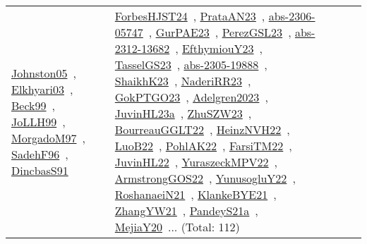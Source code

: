 {\begin{longtable}{lp{3cm}>{\raggedright\arraybackslash}p{6cm}>{\raggedright\arraybackslash}p{6cm}>{\raggedright\arraybackslash}p{8cm}}
\href{../works/Johnston05.pdf}{Johnston05}~\cite{Johnston05}, \href{../works/Elkhyari03.pdf}{Elkhyari03}~\cite{Elkhyari03}, \href{../works/Beck99.pdf}{Beck99}~\cite{Beck99}, \href{../works/JoLLH99.pdf}{JoLLH99}~\cite{JoLLH99}, \href{../works/MorgadoM97.pdf}{MorgadoM97}~\cite{MorgadoM97}, \href{../works/SadehF96.pdf}{SadehF96}~\cite{SadehF96}, \href{../works/DincbasS91.pdf}{DincbasS91}~\cite{DincbasS91} & \href{../works/ForbesHJST24.pdf}{ForbesHJST24}~\cite{ForbesHJST24}, \href{../works/PrataAN23.pdf}{PrataAN23}~\cite{PrataAN23}, \href{../works/abs-2306-05747.pdf}{abs-2306-05747}~\cite{abs-2306-05747}, \href{../works/GurPAE23.pdf}{GurPAE23}~\cite{GurPAE23}, \href{../works/PerezGSL23.pdf}{PerezGSL23}~\cite{PerezGSL23}, \href{../works/abs-2312-13682.pdf}{abs-2312-13682}~\cite{abs-2312-13682}, \href{../works/EfthymiouY23.pdf}{EfthymiouY23}~\cite{EfthymiouY23}, \href{../works/TasselGS23.pdf}{TasselGS23}~\cite{TasselGS23}, \href{../works/abs-2305-19888.pdf}{abs-2305-19888}~\cite{abs-2305-19888}, \href{../works/ShaikhK23.pdf}{ShaikhK23}~\cite{ShaikhK23}, \href{../works/NaderiRR23.pdf}{NaderiRR23}~\cite{NaderiRR23}, \href{../works/GokPTGO23.pdf}{GokPTGO23}~\cite{GokPTGO23}, \href{../works/Adelgren2023.pdf}{Adelgren2023}~\cite{Adelgren2023}, \href{../works/JuvinHL23a.pdf}{JuvinHL23a}~\cite{JuvinHL23a}, \href{../works/ZhuSZW23.pdf}{ZhuSZW23}~\cite{ZhuSZW23}, \href{../works/BourreauGGLT22.pdf}{BourreauGGLT22}~\cite{BourreauGGLT22}, \href{../works/HeinzNVH22.pdf}{HeinzNVH22}~\cite{HeinzNVH22}, \href{../works/LuoB22.pdf}{LuoB22}~\cite{LuoB22}, \href{../works/PohlAK22.pdf}{PohlAK22}~\cite{PohlAK22}, \href{../works/FarsiTM22.pdf}{FarsiTM22}~\cite{FarsiTM22}, \href{../works/JuvinHL22.pdf}{JuvinHL22}~\cite{JuvinHL22}, \href{../works/YuraszeckMPV22.pdf}{YuraszeckMPV22}~\cite{YuraszeckMPV22}, \href{../works/ArmstrongGOS22.pdf}{ArmstrongGOS22}~\cite{ArmstrongGOS22}, \href{../works/YunusogluY22.pdf}{YunusogluY22}~\cite{YunusogluY22}, \href{../works/RoshanaeiN21.pdf}{RoshanaeiN21}~\cite{RoshanaeiN21}, \href{../works/KlankeBYE21.pdf}{KlankeBYE21}~\cite{KlankeBYE21}, \href{../works/ZhangYW21.pdf}{ZhangYW21}~\cite{ZhangYW21}, \href{../works/PandeyS21a.pdf}{PandeyS21a}~\cite{PandeyS21a}, \href{../works/MejiaY20.pdf}{MejiaY20}~\cite{MejiaY20}... (Total: 112)\\

\end{longtable}}
